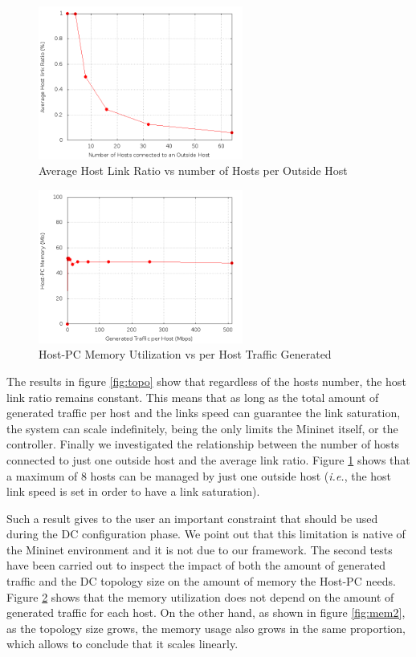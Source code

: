 \documentclass[12pt,english,oneside]{book}
\begin{document}
\begin{figure}[h!tbp]
        \centering
        \includegraphics[width=0.6\textwidth]{figures/out_hosts_ratio.png}
        \caption{Average Host Link Ratio vs number of Hosts per Outside Host}
        \label{fig:hosts}
\end{figure}
\begin{figure}[h!tbp]
        \centering
        \includegraphics[width=0.6\textwidth]{figures/mem1_utilization.png}
        \caption{Host-PC Memory Utilization vs per Host Traffic Generated}
        \label{fig:mem1}
\end{figure}

The results in figure \ref{fig:topo} show that regardless of the hosts number, the host link ratio remains constant.
This means that as long as the total amount of generated traffic per host and the links speed can guarantee the link saturation, the system can scale indefinitely, being the only limits the Mininet itself, or the controller. 
Finally we investigated the relationship between the number of hosts connected to just one outside host and the average link ratio.
Figure \ref{fig:hosts} shows that a maximum of $8$ hosts can be managed by just one outside host (\textit{i.e.}, the host link speed is set in order to have a link saturation).

Such a result gives to the user an important constraint that should be used during the DC configuration phase.
We point out that this limitation is native of the Mininet environment and it is not due to our framework.
The second tests have been carried out to inspect the impact of both the amount of generated traffic and the DC topology size on the amount of memory the Host-PC needs.
Figure \ref{fig:mem1} shows that the memory utilization does not depend on the amount of generated traffic for each host.
On the other hand, as shown in figure \ref{fig:mem2}, as the topology size grows, the memory usage also grows in the same proportion, which allows to conclude that it scales linearly.
\end{document}
